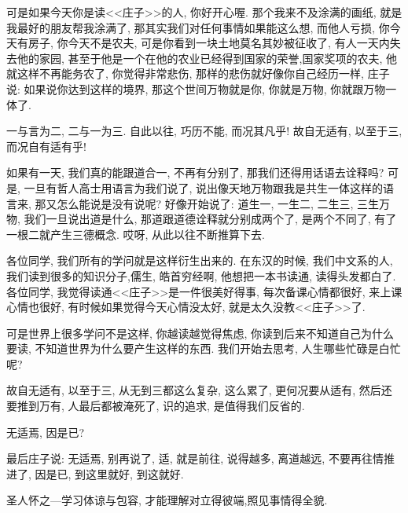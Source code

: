 \documentclass[11pt]{article}
\begin{document}
可是如果今天你是读<<庄子>>的人, 你好开心喔. 那个我来不及涂满的画纸, 就是我最好的朋友帮我涂满了, 那其实我们对任何事情如果能这么想, 而他人亏损, 你今天有房子, 你今天不是农夫, 可是你看到一块土地莫名其妙被征收了, 有人一天内失去他的家园, 甚至于他是一个在他的农业已经得到国家的荣誉,国家奖项的农夫, 他就这样不再能务农了, 你觉得非常悲伤, 那样的悲伤就好像你自己经历一样, 庄子说: 如果说你达到这样的境界, 那这个世间万物就是你, 你就是万物, 你就跟万物一体了. 

\begin{center}
	{\color{magenta} 一与言为二, 二与一为三. 自此以往, 巧历不能, 而况其凡乎! 故自无适有, 以至于三, 而况自有适有乎!}
\end{center}

\vspace{-0.5cm}

如果有一天, 我们真的能跟道合一, 不再有分别了, 那我们还得用话语去诠释吗? 可是, 一旦有哲人高士用语言为我们说了, 说出像天地万物跟我是共生一体这样的语言来, 那又怎么能说是没有说呢? 好像开始说了: 道生一, 一生二, 二生三, 三生万物, 我们一旦说出道是什么, 那道跟道德诠释就分别成两个了, 是两个不同了, 有了一根二就产生三德概念. 哎呀, 从此以往不断推算下去. 

各位同学, 我们所有的学问就是这样衍生出来的. 在东汉的时候, 我们中文系的人, 我们读到很多的知识分子,儒生, 皓首穷经啊, 他想把一本书读通, 读得头发都白了. 各位同学, 我觉得读通<<庄子>>是一件很美好得事, 每次备课心情都很好, 来上课心情也很好, 有时候如果觉得今天心情没太好, 就是太久没教<<庄子>>了.

可是世界上很多学问不是这样, 你越读越觉得焦虑, 你读到后来不知道自己为什么要读, 不知道世界为什么要产生这样的东西. 我们开始去思考, 人生哪些忙碌是白忙呢? 

{\color{blue}  故自无适有, 以至于三,} 从无到三都这么复杂, 这么累了, 更何况要从适有, 然后还要推到万有, 人最后都被淹死了, 识的追求, 是值得我们反省的.

\begin{center}
	{\color{magenta} 无适焉, 因是已?}
\end{center}

\vspace{-0.5cm}

最后庄子说: {\color{blue} 无适焉}, 别再说了, 适, 就是前往, 说得越多, 离道越远, 不要再往情推进了, {\color{blue} 因是已}, 到这里就好, 到这就好. 

\newpage 


{\Large {\color{purple} 圣人怀之---学习体谅与包容, 才能理解对立得彼端,照见事情得全貌.}}

\vspace{0.25cm}
\end{document}
